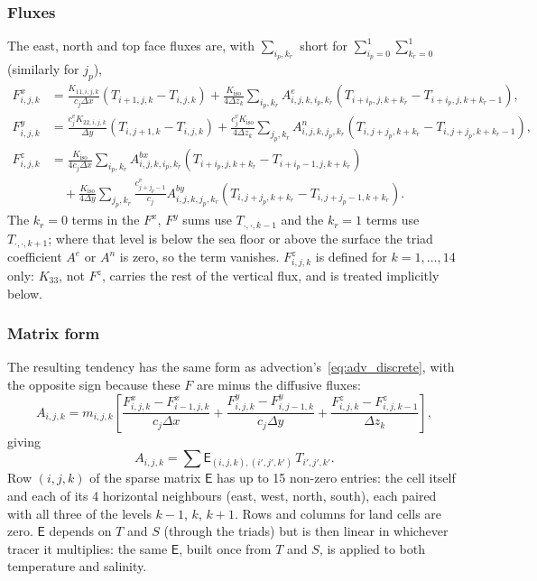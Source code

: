 \documentclass{article}
\begin{document}
\subsubsection*{Fluxes}
The east, north and top face fluxes are, with $\displaystyle\sum_{i_p,k_r}$ short for $\sum_{i_p=0}^1\sum_{k_r=0}^1$ (similarly for $j_p$),
\begin{align*}
F^x_{i,j,k} &= \frac{K_{11,i,j,k}}{c_j\Delta x}(T_{i+1,j,k}-T_{i,j,k}) + \frac{K_\text{iso}}{4\Delta z_k}\sum_{i_p,k_r} A^e_{i,j,k,i_p,k_r}\left(T_{i+i_p,j,k+k_r} - T_{i+i_p,j,k+k_r-1}\right), \\
F^y_{i,j,k} &= \frac{c^v_j K_{22,i,j,k}}{\Delta y}(T_{i,j+1,k}-T_{i,j,k}) + \frac{c^v_j K_\text{iso}}{4\Delta z_k}\sum_{j_p,k_r} A^n_{i,j,k,j_p,k_r}\left(T_{i,j+j_p,k+k_r} - T_{i,j+j_p,k+k_r-1}\right), \\
F^z_{i,j,k} &= \frac{K_\text{iso}}{4c_j\Delta x}\sum_{i_p,k_r} A^{bx}_{i,j,k,i_p,k_r}\left(T_{i+i_p,j,k+k_r} - T_{i+i_p-1,j,k+k_r}\right) \\
&\quad + \frac{K_\text{iso}}{4\Delta y}\sum_{j_p,k_r} \frac{c^v_{j+j_p-1}}{c_j}A^{by}_{i,j,k,j_p,k_r}\left(T_{i,j+j_p,k+k_r} - T_{i,j+j_p-1,k+k_r}\right).
\end{align*}
The $k_r=0$ terms in the $F^x$, $F^y$ sums use $T_{\cdot,\cdot,k-1}$ and the $k_r=1$ terms use $T_{\cdot,\cdot,k+1}$; where that level is below the sea floor or above the surface the triad coefficient $A^e$ or $A^n$ is zero, so the term vanishes. $F^z_{i,j,k}$ is defined for $k=1,\dots,14$ only: $K_{33}$, not $F^z$, carries the rest of the vertical flux, and is treated implicitly below.

\subsubsection*{Matrix form}
The resulting tendency has the same form as advection's~\eqref{eq:adv_discrete}, with the opposite sign because these $F$ are minus the diffusive fluxes:
\begin{equation}
A_{i,j,k} = m_{i,j,k}\left[\frac{F^x_{i,j,k}-F^x_{i-1,j,k}}{c_j\Delta x} + \frac{F^y_{i,j,k}-F^y_{i,j-1,k}}{c_j\Delta y} + \frac{F^z_{i,j,k}-F^z_{i,j,k-1}}{\Delta z_k}\right],
\label{eq:iso_discrete}
\end{equation}
giving
\[
A_{i,j,k} = \sum \mathsf{E}_{(i,j,k),(i',j',k')}\, T_{i',j',k'}.
\]
Row $(i,j,k)$ of the sparse matrix $\mathsf{E}$ has up to 15 non-zero entries: the cell itself and each of its 4 horizontal neighbours (east, west, north, south), each paired with all three of the levels $k-1$, $k$, $k+1$.
Rows and columns for land cells are zero.
$\mathsf{E}$ depends on $T$ and $S$ (through the triads) but is then linear in whichever tracer it multiplies: the same $\mathsf{E}$, built once from $T$ and $S$, is applied to both temperature and salinity.
\end{document}
